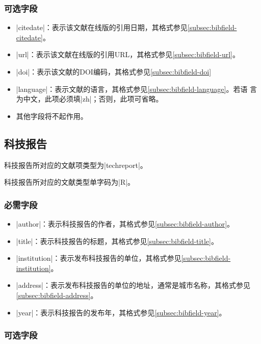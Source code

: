 \subsubsection{可选字段}

\begin{itemize}
\item |citedate|：表示该文献在线版的引用日期，其格式参见\ref{subsec:bibfield-citedate}。
\item |url|：表示该文献在线版的引用URL，其格式参见\ref{subsec:bibfield-url}。
\item |doi|：表示该文献的DOI编码，其格式参见\ref{subsec:bibfield-doi}
\item |language|：表示文献的语言，其格式参见\ref{subsec:bibfield-language}。若语
  言为中文，此项必须填|zh|；否则，此项可省略。
\item 其他字段将不起作用。
\end{itemize}

\subsection{科技报告}\label{subsec:bibtype-techreport}

科技报告所对应的{\BibTeX}文献项类型为|techreport|。

科技报告所对应的文献类型\cite{gbt3469-1983}单字码为|R|。

\subsubsection{必需字段}

\begin{itemize}
\item |author|：表示科技报告的作者，其格式参见\ref{subsec:bibfield-author}。
\item |title|：表示科技报告的标题，其格式参见\ref{subsec:bibfield-title}。
\item |institution|：表示发布科技报告的单位，其格式参见\ref{subsec:bibfield-institution}。
\item |address|：表示发布科技报告的单位的地址，通常是城市名称，其格式参见
  \ref{subsec:bibfield-address}。
\item |year|：表示科技报告的发布年，其格式参见\ref{subsec:bibfield-year}。
\end{itemize}

\subsubsection{可选字段}

